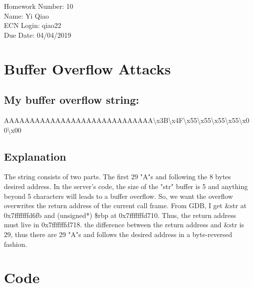 \documentclass[11pt]{article}
\begin{document}
\noindent Homework Number: 10\\
Name: Yi Qiao\\
ECN Login: qiao22\\
Due Date: 04/04/2019\\

\section*{Buffer Overflow Attacks}
\subsection*{My buffer overflow string:}
AAAAAAAAAAAAAAAAAAAAAAAAAAAAA\textbackslash x3B\textbackslash x4F\textbackslash x55\textbackslash x55\textbackslash x55\textbackslash x55\textbackslash x00\textbackslash x00
\subsection*{Explanation}
The string consists of two parts. The first 29 "A"s and following the 8 bytes desired address. In the server's code, the size of the "str" buffer is 5 and anything beyond 5 characters will leads to a buffer overflow. So, we want the overflow overwrites the return address of the current call frame. From GDB, I get \&str at 0x7fffffffd6fb and (unsigned*) \$rbp at 0x7fffffffd710. Thus, the return address must live in 0x7fffffffd718. the difference between the return address and \&str is 29, thus there are 29 "A"s and follows the desired address in a byte-reversed fashion.

\section*{Code}
\inputminted[breaklines]{c}{new_server.c}
\end{document}
